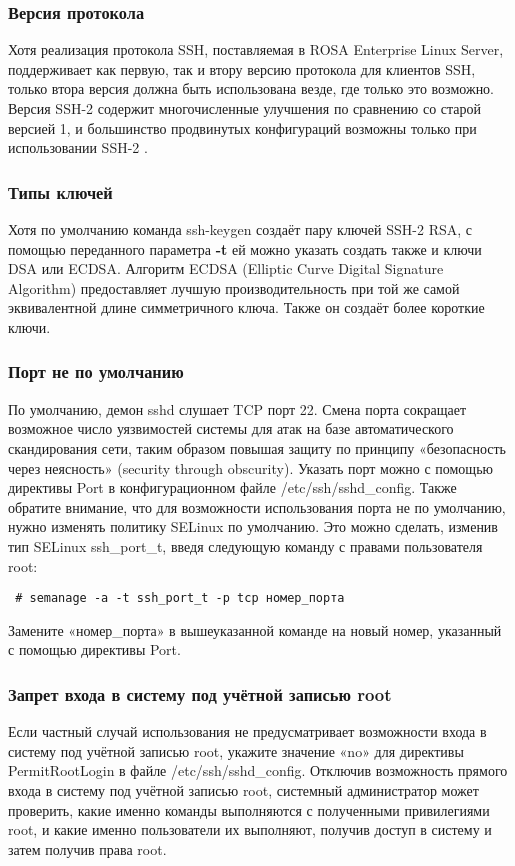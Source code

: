\documentclass[a4paper,10pt,twoside]{article}
\begin{document}
\subsubsection{Версия протокола}
Хотя реализация протокола SSH, поставляемая в ROSA Enterprise Linux Server, поддерживает как  первую, так и втору версию протокола для клиентов SSH, только втора версия должна быть использована везде, где только это возможно. Версия SSH-2 содержит многочисленные улучшения по сравнению со старой версией 1, и большинство продвинутых конфигураций возможны только при использовании SSH-2 .

 
\subsubsection{Типы ключей}
Хотя по умолчанию команда ssh-keygen создаёт пару ключей SSH-2 RSA, с помощью переданного параметра \textbf{-t} ей можно указать создать также и ключи DSA или ECDSA. Алгоритм ECDSA (Elliptic Curve Digital Signature Algorithm) предоставляет лучшую производительность при той же самой эквивалентной длине симметричного ключа. Также он создаёт более короткие ключи.

\subsubsection{Порт не по умолчанию}
По умолчанию, демон sshd слушает TCP порт 22. Смена порта сокращает возможное число уязвимостей системы для атак на базе автоматического скандирования сети, таким образом повышая защиту по принципу «безопасность через неясность» (security through obscurity). Указать порт можно с помощью директивы Port в конфигурационном файле /etc/ssh/sshd\_config. Также обратите внимание, что для возможности использования порта не по умолчанию, нужно изменять политику SELinux по умолчанию. Это можно сделать, изменив тип SELinux ssh\_port\_t, введя следующую команду с правами пользователя root: 

\begin{verbatim}
 # semanage -a -t ssh_port_t -p tcp номер_порта
\end{verbatim} 
Замените «номер\_порта» в вышеуказанной команде на новый номер, указанный с помощью директивы Port.

\subsubsection{Запрет входа в систему под учётной записью root}
Если частный случай использования не предусматривает возможности входа в систему под учётной записью root, укажите значение «no» для директивы PermitRootLogin в файле /etc/ssh/sshd\_config. Отключив возможность прямого входа в систему под учётной записью root, системный администратор может проверить, какие именно команды выполняются с полученными привилегиями root, и какие именно пользователи их выполняют, получив доступ в систему и затем получив права root.
\end{document}
